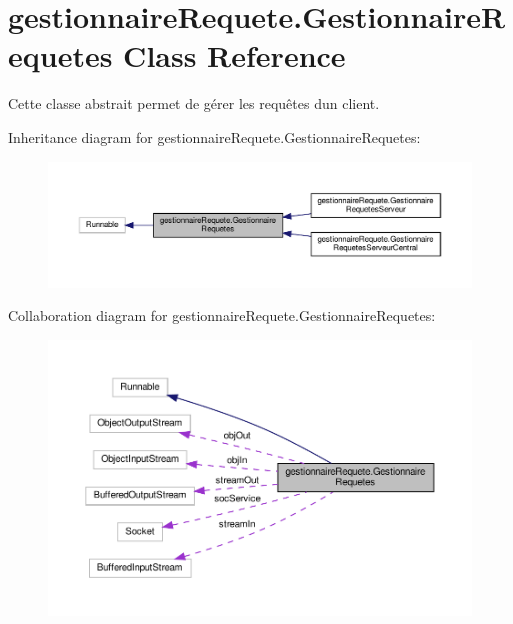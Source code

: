 \hypertarget{classgestionnaireRequete_1_1GestionnaireRequetes}{}\section{gestionnaire\+Requete.\+Gestionnaire\+Requetes Class Reference}
\label{classgestionnaireRequete_1_1GestionnaireRequetes}


Cette classe abstrait permet de gérer les requêtes d\textquotesingle{}un client.  




Inheritance diagram for gestionnaire\+Requete.\+Gestionnaire\+Requetes\+:\nopagebreak
\begin{figure}[H]
\begin{center}
\leavevmode
\includegraphics[width=350pt]{classgestionnaireRequete_1_1GestionnaireRequetes__inherit__graph}
\end{center}
\end{figure}


Collaboration diagram for gestionnaire\+Requete.\+Gestionnaire\+Requetes\+:\nopagebreak
\begin{figure}[H]
\begin{center}
\leavevmode
\includegraphics[width=350pt]{classgestionnaireRequete_1_1GestionnaireRequetes__coll__graph}
\end{center}
\end{figure}
